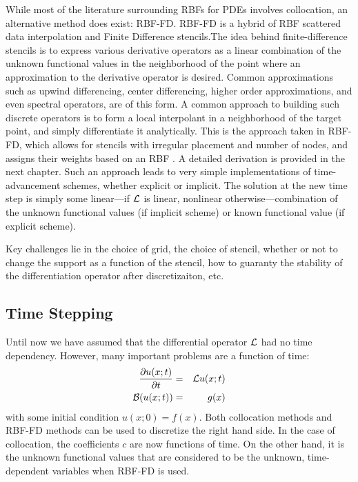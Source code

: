 \documentclass{report}
\begin{document}
{%
While most of the literature surrounding RBFs for PDEs involves collocation, an alternative method does exist: RBF-FD. RBF-FD is a hybrid of RBF scattered data interpolation and Finite Difference stencils.The idea behind finite-difference stencils is to express various derivative operators as a linear combination of the unknown functional values in the neighborhood of the point where an approximation to the derivative operator is desired. Common approximations such as upwind differencing, center differencing, higher order approximations, and even spectral operators, are of this form. A common approach to building such discrete operators is to form a local interpolant in a neighborhood of the target point, and simply differentiate it analytically. This is the approach taken in RBF-FD,   which  allows for stencils with irregular placement and number of nodes, and assigns their weights based on an RBF \cite{Wright2003}. 
A detailed derivation is provided in the next chapter. %
Such an approach leads to very simple implementations of time-advancement schemes, whether explicit or implicit. The solution at the new time step is simply some linear---if $\mathcal{L}$ is linear, nonlinear otherwise---combination of the unknown functional values (if implicit scheme) or known functional value (if explicit scheme). 

Key challenges lie in the choice of grid, the choice of stencil, whether or not to change the support as a function of the stencil, how to guaranty the stability of the differentiation  operator after discretizaiton, etc. 


\subsection{Time Stepping}

Until now we have assumed that the differential operator $\mathcal{L}$ had no time dependency. However, many important problems are a function of time: 
\begin{eqnarray}
\frac{\partial u(x;t)}{\partial t} &=& \mathcal{L}u(x;t) \\
\mathcal{B}(u(x;t)) &=& g(x) 
\label{eqn:timedep}
\end{eqnarray}
with some initial condition $u(x;0) = f(x)$. Both collocation methods and RBF-FD methods can be used to discretize the right hand side. In the case of collocation, the coefficients $c$ are now functions of time. On the other hand, it is the unknown functional values that are considered to be the unknown, time-dependent variables when RBF-FD is used. 	

}
\end{document}
